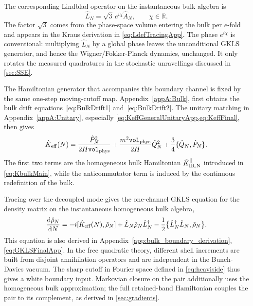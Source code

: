 \documentclass{article}
\newcommand{\Vphys}{\mathtt{vol}_{\rm phys}}
\numberwithin{equation}{section}
\begin{document}
	The corresponding Lindblad operator on the instantaneous bulk algebra is
	\begin{equation}\label{eq:Lsqrt3A}
		\hat L_N = \sqrt3\,e^{i\chi}\hat A_N, \qquad \chi\in\mathbb R .
	\end{equation}
	The factor \(\sqrt3\) comes from the phase-space volume entering the bulk per $e$-fold and appears in the Kraus derivation in \cref{eq:LdefTracingApp}. The phase \(e^{i\chi}\) is conventional: multiplying \(\hat L_N\) by a global phase leaves the unconditional GKLS generator, and hence the Wigner/Fokker-Planck dynamics, unchanged. It only rotates the measured quadratures in the stochastic unravellings discussed in \cref{sec:SSE}.

	The Hamiltonian generator that accompanies this boundary channel is fixed by the same one-step moving-cutoff map. Appendix~\ref{appA:Bulk}, first obtains the bulk drift equations~\eqref{eq:BulkDrift1} and~\eqref{eq:BulkDrift2}. The unitary matching in Appendix~\ref{appA:Unitary}, especially \cref{eq:KeffGeneralUnitaryApp,eq:KeffFinal}, then gives
	\begin{equation}\label{eq:Keff}
		\hat K_{\rm eff}(N) = \frac{\hat P_N^2}{2H\Vphys} + \frac{m^2\Vphys}{2H}\hat Q_N^2 + \frac34\{\hat Q_N,\hat P_N\}.
	\end{equation}
	The first two terms are the homogeneous bulk Hamiltonian  \(\hat K_{\rm IR, N}^{\parallel}\) introduced in \cref{eq:KbulkMain}, while the anticommutator term is induced by the continuous redefinition of the bulk.

	Tracing over the decoupled mode gives the one-channel GKLS equation for the density matrix on the instantaneous homogeneous bulk algebra,
	\begin{equation}\label{eq:Master1DN}
		\frac{\dd \hat\rho_N}{\dd N} = -i[\hat K_{\rm eff}(N),\hat\rho_N] + \hat L_N\hat\rho_N\hat L_N^\dagger - \frac12 \bigl\{ \hat L_N^\dagger\hat L_N,\hat\rho_N \bigr\}.
	\end{equation}
	This equation is also derived in Appendix~\ref{app:bulk_boundary_derivation}, \cref{eq:GKLSFinalApp}. In the free quadratic theory, different shell increments are built from disjoint annihilation operators and are independent in the Bunch-Davies vacuum. The sharp cutoff in Fourier space defined in \cref{eq:heaviside} thus gives a white boundary input. Markovian closure on the pair additionally uses the homogeneous bulk approximation; the full retained-band Hamiltonian couples the pair to its complement, as derived in \cref{sec:gradients}. 
\end{document}
